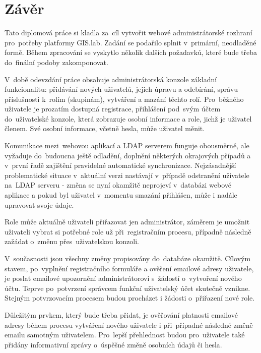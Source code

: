 \chapter*{Závěr}
\label{5-zaver}


Tato diplomová práce si kladla za~cíl vytvořit webové administrátorské
rozhraní pro~potřeby platformy GIS.lab. Zadání se podařilo splnit 
v~primární, neodladěné formě. Během zpracování se vyskytlo několik
dalších požadavků, které bude třeba do~finální podoby zakomponovat.

V~době odevzdání práce obsahuje administrátorská konzole základní
funkciona\-litu: přidávání nových uživatelů, jejich úpravu a odebírání,
správu příslušnosti k~rolím (skupinám), vytváření a mazání těchto
rolí. Pro~běžného uživatele je prozatím dostupná registrace,
přihlášení pod~svým účtem do~uživatelské konzole, která zobrazuje
osobní informace a role, jichž je uživatel členem. Své osobní
informace, včetně hesla, může uživatel měnit.

Komunikace mezi~webovou aplikací a LDAP serverem funguje obousměrně,
ale vyžaduje do~budoucna ještě odladění, doplnění některých okrajových
případů a v~první řadě zajištění pravidelné automatické
synchronizace. Nejzásadnější problematické situace v~aktuální verzi
nastávají v~případě odstranění uživatele na~LDAP serveru - změna se
nyní okamžitě neprojeví v~databázi webové aplikace a pokud byl
uživatel v~momentu smazání přihlášen, může i nadále upravovat svoje
údaje.

Role může aktuálně uživateli přiřazovat jen administrátor, záměrem je
umožnit uživateli vybrat si potřebné role už při~registračním procesu,
případně následně zažádat o~změnu přes~uživatelskou konzoli.

V~současnosti jsou všechny změny propisovány do~databáze
okamžitě. Cílovým stavem, po~vyplnění registračního formuláře a
ověření emailové adresy uživatele, je poslat emailové upozornění
administrátorovi s~žádostí o~vytvoření nového účtu. Teprve 
po~potvrzení správcem funkční uživatelský účet skutečně vznikne. Stejným
potvrzovacím procesem budou procházet i žádosti o~přiřazení nové role.

Důležitým prvkem, který bude třeba přidat, je ověřování platnosti
emailové adresy během procesu vytváření nového uživatele i 
při~případné následné změně emailu samotným uživatelem. Pro~lepší
přehlednost budou pro~uživatele také přidány informativní zprávy 
o~úspěšné změně osobních údajů či hesla.

